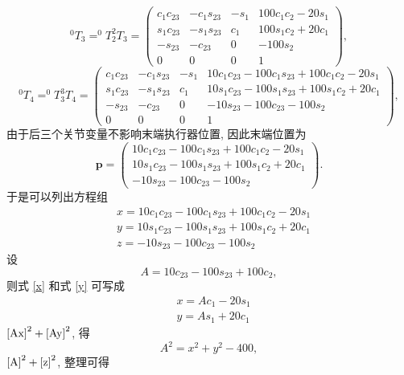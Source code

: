 \documentclass{article}
\begin{document}
\[
^0T_3 = ^0T_2 ^2T_3 = 
\begin{pmatrix}
c_1 c_{23} & -c_1 s_{23} & -s_1 & 100c_1c_2-20s_1\\
s_1 c_{23} & -s_1 s_{23} & c_1 & 100s_1c_2+20c_1\\
-s_{23} & -c_{23} & 0 & -100s_2\\
0 & 0 & 0 & 1
\end{pmatrix},
\]
\[
^0T_4 = ^0T_3 ^3T_4 = 
\begin{pmatrix}
c_1 c_{23} & -c_1 s_{23} & -s_1 & 10c_1c_{23}-100c_1s_{23}+100c_1c_2-20s_1\\
s_1 c_{23} & -s_1 s_{23} & c_1 & 10s_1c_{23}-100s_1s_{23}+100s_1c_2+20c_1\\
-s_{23} & -c_{23} & 0 & -10s_{23}-100c_{23}-100s_2\\
0 & 0 & 0 & 1
\end{pmatrix},
\]
由于后三个关节变量不影响末端执行器位置, 因此末端位置为
\[
\mathbf{p} =
\begin{pmatrix}
10c_1c_{23}-100c_1s_{23}+100c_1c_2-20s_1\\ 10s_1c_{23}-100s_1s_{23}+100s_1c_2+20c_1\\ -10s_{23}-100c_{23}-100s_2
\end{pmatrix}.
\]
于是可以列出方程组
\begin{subequations}
    \label{fkine}
    \begin{align}
     &x = 10c_1c_{23}-100c_1s_{23}+100c_1c_2-20s_1 \label{x} \\
     &y = 10s_1c_{23}-100s_1s_{23}+100s_1c_2+20c_1 \label{y} \\
     &z = -10s_{23}-100c_{23}-100s_2 \label{z}
    \end{align}
\end{subequations}
设
\begin{equation}
\label{A}
A = 10c_{23}-100s_{23}+100c_2,
\end{equation}
则式 \eqref{x} 和式 \eqref{y} 可写成
\begin{subequations}
    \begin{align}
     &x = Ac_1 - 20s_1 \label{Ax} \\
     &y = As_1 + 20c_1 \label{Ay}
    \end{align}
\end{subequations}
$\eqref{Ax}^2 + \eqref{Ay}^2$, 得
\begin{equation}
\label{Axy}
A^2 = x^2 + y^2 - 400,
\end{equation}
$\eqref{A}^2 + \eqref{z}^2$, 整理可得
\end{document}
